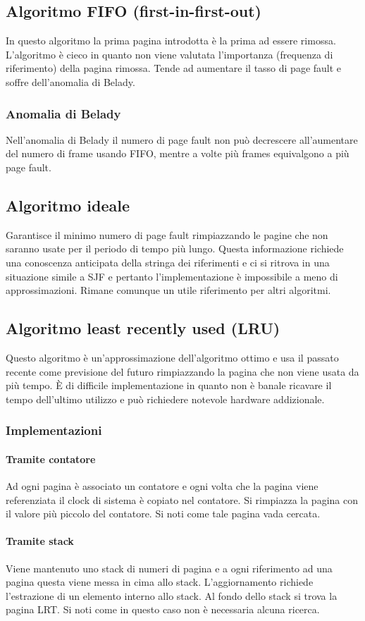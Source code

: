 \subsection{Algoritmo FIFO (first-in-first-out)}
In questo algoritmo la prima pagina introdotta \`e la prima ad essere rimossa. L'algoritmo \`e cieco in quanto non viene valutata l'importanza (frequenza di riferimento) della pagina 
rimossa. Tende ad aumentare il tasso di page fault e soffre dell'anomalia di Belady. 
\subsubsection{Anomalia di Belady}
Nell'anomalia di Belady il numero di page fault non pu\`o decrescere all'aumentare del numero di frame usando FIFO, mentre a volte pi\`u frames equivalgono a pi\`u page fault. 
\subsection{Algoritmo ideale}
Garantisce il minimo numero di page fault rimpiazzando le pagine che non saranno usate per il periodo di tempo pi\`u lungo. Questa informazione richiede una conoscenza anticipata della
stringa dei riferimenti e ci si ritrova in una situazione simile a SJF e pertanto l'implementazione \`e impossibile a meno di approssimazioni. Rimane comunque un utile riferimento per
altri algoritmi. 
\subsection{Algoritmo least recently used (LRU)}
Questo algoritmo \`e un'approssimazione dell'algoritmo ottimo e usa il passato recente come previsione del futuro rimpiazzando la pagina che non viene usata da pi\`u tempo. \`E di
difficile implementazione in quanto non \`e banale ricavare il tempo dell'ultimo utilizzo e pu\`o richiedere notevole hardware addizionale. 
\subsubsection{Implementazioni}
\paragraph{Tramite contatore}
Ad ogni pagina \`e associato un contatore e ogni volta che la pagina viene referenziata il clock di sistema \`e copiato nel contatore. Si rimpiazza la pagina con il valore pi\`u 
piccolo del contatore. Si noti come tale pagina vada cercata. 
\paragraph{Tramite stack}
Viene mantenuto uno stack di numeri di pagina e a ogni riferimento ad una pagina questa viene messa in cima allo stack. L'aggiornamento richiede l'estrazione di un elemento interno allo
stack. Al fondo dello stack si trova la pagina LRT. Si noti come in questo caso non \`e necessaria alcuna ricerca. 
